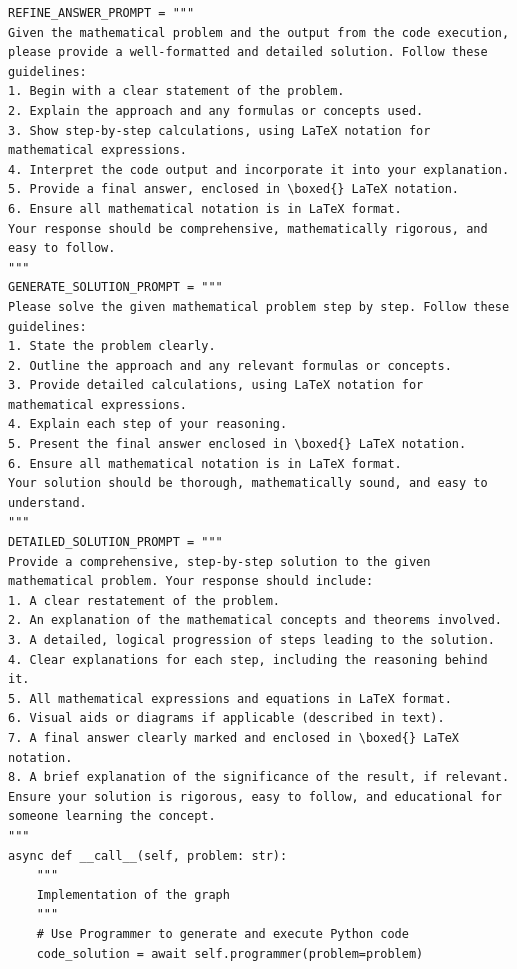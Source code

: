 \begin{tcolorbox}[title={\textbf{\small The optimal workflow generated for MATH}}, boxrule=1pt, arc=0mm, colback=black!5!white, colframe=black!75!white, breakable, before skip=10pt, after skip=10pt, pad at break=2mm, parbox=false] \begin{verbatim}
REFINE_ANSWER_PROMPT = """
Given the mathematical problem and the output from the code execution, please provide a well-formatted and detailed solution. Follow these guidelines:
1. Begin with a clear statement of the problem.
2. Explain the approach and any formulas or concepts used.
3. Show step-by-step calculations, using LaTeX notation for mathematical expressions.
4. Interpret the code output and incorporate it into your explanation.
5. Provide a final answer, enclosed in \boxed{} LaTeX notation.
6. Ensure all mathematical notation is in LaTeX format.
Your response should be comprehensive, mathematically rigorous, and easy to follow.
"""
GENERATE_SOLUTION_PROMPT = """
Please solve the given mathematical problem step by step. Follow these guidelines:
1. State the problem clearly.
2. Outline the approach and any relevant formulas or concepts.
3. Provide detailed calculations, using LaTeX notation for mathematical expressions.
4. Explain each step of your reasoning.
5. Present the final answer enclosed in \boxed{} LaTeX notation.
6. Ensure all mathematical notation is in LaTeX format.
Your solution should be thorough, mathematically sound, and easy to understand.
"""
DETAILED_SOLUTION_PROMPT = """
Provide a comprehensive, step-by-step solution to the given mathematical problem. Your response should include:
1. A clear restatement of the problem.
2. An explanation of the mathematical concepts and theorems involved.
3. A detailed, logical progression of steps leading to the solution.
4. Clear explanations for each step, including the reasoning behind it.
5. All mathematical expressions and equations in LaTeX format.
6. Visual aids or diagrams if applicable (described in text).
7. A final answer clearly marked and enclosed in \boxed{} LaTeX notation.
8. A brief explanation of the significance of the result, if relevant.
Ensure your solution is rigorous, easy to follow, and educational for someone learning the concept.
"""
async def __call__(self, problem: str):
    """
    Implementation of the graph
    """
    # Use Programmer to generate and execute Python code
    code_solution = await self.programmer(problem=problem)

\end{verbatim}
\end{tcolorbox}

